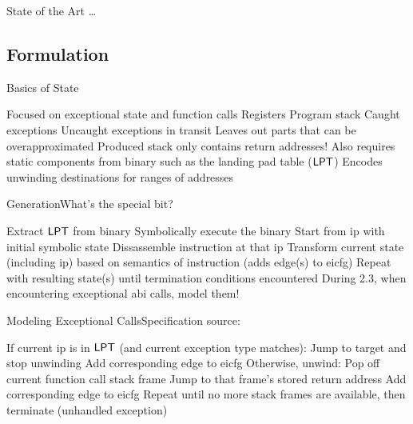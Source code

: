\begin{frame}{State of the Art}
  \todo\dots
\end{frame}

\subsection{Formulation}
\begin{frame}{Basics of State}
  \begin{outline}
    \1 Focused on \alert{exceptional state} and \alert{function calls}
      \2 Registers
      \2 Program stack
      \2 \alert{Caught} exceptions
      \2 \alert{Uncaught} exceptions in transit
    \1 Leaves out parts that can be overapproximated
      \2 Produced stack only contains return addresses!
    \1 Also requires static components from binary such as the \alert{landing pad table ($\operatorname{\mathsf{LPT}}$)}
      \2 Encodes unwinding destinations for ranges of addresses
  \end{outline}
\end{frame}

\begin{frame}{Generation}{What's the special bit?}
  \begin{outline}[enumerate]
    \1<+-> Extract $\operatorname{\mathsf{LPT}}$ from binary
    \1<+-> \alert{Symbolically execute} the binary
      \2 Start from \gls{ip} with initial \alert{symbolic state}
      \2 Dissassemble instruction at that \gls{ip}
      \2 Transform current state (including \gls{ip}) based on semantics of instruction (adds edge(s) to \gls{eicfg})
      \2 Repeat with resulting state(s) until termination conditions encountered
    \1<+-> \alert{During 2.3, when encountering exceptional \gls{abi} calls, model them!}
  \end{outline}
\end{frame}

\begin{frame}{Modeling Exceptional  Calls}{Specification source: }
  \begin{block}{}
    \begin{outline}[enumerate]
      \1<+-> If current \gls{ip} is in $\operatorname{\mathsf{LPT}}$ (and current exception type matches):
        \2 Jump to target and stop unwinding
        \2 Add corresponding edge to \gls{eicfg}
      \1<+-> Otherwise, unwind:
        \2 Pop off current function call stack frame
        \2 Jump to that frame's stored return address
        \2 Add corresponding edge to \gls{eicfg}
      \1<+-> Repeat until no more stack frames are available, then terminate (\alert{unhandled exception})
    \end{outline}
  \end{block}
\end{frame}

